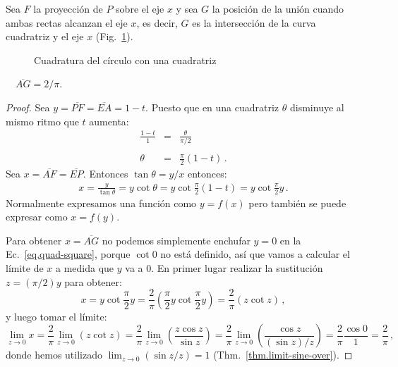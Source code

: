 Sea $F$ la proyección de $P$ sobre el eje $x$ y sea $G$ la posición de la unión cuando ambas rectas alcanzan el eje $x$, es decir, $G$ es la intersección de la curva cuadratriz y el eje $x$ (Fig.~\ref{f.square-quad}).
\begin{figure}[ht]
\begin{center}
\end{center}
\caption{Cuadratura del círculo con una cuadratriz}\label{f.square-quad}
\end{figure}

\begin{theorem}
$\quad\overline{AG}=2/\pi$.
\end{theorem}

\begin{proof}
Sea $y=\overline{PF}=\overline{EA}=1-t$. Puesto que en una cuadratriz $\theta$ disminuye al mismo ritmo que $t$ aumenta:
\begin{eqnarray*}
\frac{1-t}{1} &=& \frac{\theta}{\pi/2}\\
&&\\
\theta &=&\frac{\pi}{2}(1-t)\,.
\end{eqnarray*}
Sea $x=\overline{AF}=\overline{EP}$. Entonces $\tan \theta = y/x$ entonces:
\begin{align}\label{eq.quad-square}
x = \frac{y}{\tan\theta}=y\cot\theta=y\cot \frac{\pi}{2}(1-t)=y\cot \frac{\pi}{2}y\,.
\end{align}
Normalmente expresamos una función como $y=f(x)$ pero también se puede expresar como $x=f(y)$. 

Para obtener $x=\overline{AG}$ no podemos simplemente enchufar $y=0$ en la Ec.~\ref{eq.quad-square}, porque $\cot 0$ no está definido, así que vamos a calcular el límite de $x$ a medida que $y$ va a $0$. 
En primer lugar realizar la sustitución $z=(\pi/2)y$ para obtener:
\[
x = y\cot \frac{\pi}{2}y = \frac{2}{\pi} \left(\frac{\pi}{2}y\cot \frac{\pi}{2}y\right)=\frac{2}{\pi}(z\cot z)\,,
\]
y luego tomar el límite:
\[
\lim_{z\rightarrow 0} x=\frac{2}{\pi}\lim_{z\rightarrow 0} (z\cot z) = \frac{2}{\pi}\lim_{z\rightarrow 0} \left(\frac{z\cos z}{\sin z}\right) = \frac{2}{\pi}\lim_{z\rightarrow 0} \left(\frac{\cos z}{(\sin z)/z}\right) = \frac{2}{\pi}\frac{\cos 0}{1} = \frac{2}{\pi}\,,
\]
donde hemos utilizado $\lim_{z\rightarrow 0} (\sin z/z)=1$ (Thm.~\ref{thm.limit-sine-over}).
\end{proof}

